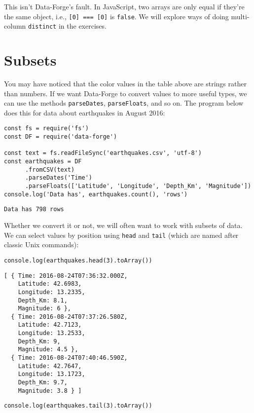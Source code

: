 This isn't Data-Forge's fault.
In JavaScript,
two arrays are only equal if they're the same object,
i.e., \texttt{[0] === [0]} is \texttt{false}.
We will explore ways of doing multi-column \texttt{distinct} in the exercises.

\section{Subsets}\label{s:dataforge-subset}

You may have noticed that the color values in the table above are strings rather than numbers.
If we want Data-Forge to convert values to more useful types,
we can use the methods \texttt{parseDates}, \texttt{parseFloats}, and so on.
The program below does this for data about earthquakes in August 2016:

\begin{verbatim}
const fs = require('fs')
const DF = require('data-forge')

const text = fs.readFileSync('earthquakes.csv', 'utf-8')
const earthquakes = DF
      .fromCSV(text)
      .parseDates('Time')
      .parseFloats(['Latitude', 'Longitude', 'Depth_Km', 'Magnitude'])
console.log('Data has', earthquakes.count(), 'rows')
\end{verbatim}

\begin{verbatim}
Data has 798 rows
\end{verbatim}

Whether we convert it or not,
we will often want to work with subsets of data.
We can select values by position using \texttt{head} and \texttt{tail}
(which are named after classic Unix commands):

\begin{verbatim}
console.log(earthquakes.head(3).toArray())
\end{verbatim}

\begin{verbatim}
[ { Time: 2016-08-24T07:36:32.000Z,
    Latitude: 42.6983,
    Longitude: 13.2335,
    Depth_Km: 8.1,
    Magnitude: 6 },
  { Time: 2016-08-24T07:37:26.580Z,
    Latitude: 42.7123,
    Longitude: 13.2533,
    Depth_Km: 9,
    Magnitude: 4.5 },
  { Time: 2016-08-24T07:40:46.590Z,
    Latitude: 42.7647,
    Longitude: 13.1723,
    Depth_Km: 9.7,
    Magnitude: 3.8 } ]
\end{verbatim}

\begin{verbatim}
console.log(earthquakes.tail(3).toArray())
\end{verbatim}


